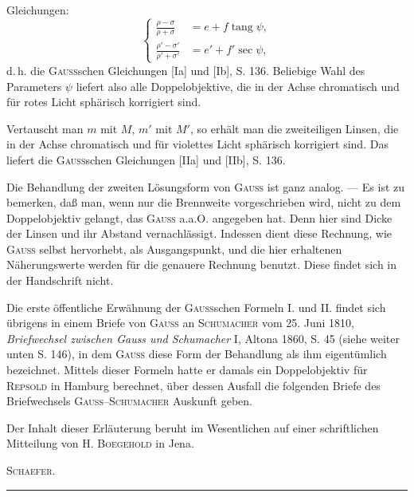 \clearpage{}
\noindent Gleichungen:
\begin{equation*}\tag*{($\rho$)}
\left\{\begin{aligned}
\frac{\rho-\sigma}{\rho+\sigma}&=e+f\operatorname{tang}\psi,\\[4pt]
\frac{\rho'-\sigma'}{\rho'+\sigma'}&=e'+f'\sec\psi,
\end{aligned}\right.
\end{equation*}
\noindent d.\,h. die \textsc{Gauss}schen Gleichungen [Ia] und [Ib], S. 136. Beliebige Wahl des Parameters $\psi$ liefert also alle Doppelobjektive, die in der Achse chromatisch und für rotes Licht sphärisch korrigiert sind.

Vertauscht man $m$ mit $M$, $m'$ mit $M'$, so erhält man die zweiteiligen Linsen, die in der Achse chromatisch und für violettes Licht sphärisch korrigiert sind. Das liefert die \textsc{Gauss}schen Gleichungen [IIa] und [IIb], S. 136.

Die Behandlung der zweiten Lösungsform von \textsc{Gauss} ist ganz analog. — Es ist zu bemerken, daß man, wenn nur die Brennweite vorgeschrieben wird, nicht zu dem Doppelobjektiv gelangt, das \textsc{Gauss} a.a.O. angegeben hat. Denn hier sind Dicke der Linsen und ihr Abstand vernachlässigt. Indessen dient diese Rechnung, wie \textsc{Gauss} selbst hervorhebt, als Ausgangspunkt, und die hier erhaltenen Näherungswerte werden für die genauere Rechnung benutzt. Diese findet sich in der Handschrift nicht.

Die erste öffentliche Erwähnung der \textsc{Gauss}schen Formeln I. und II. findet sich übrigens in einem Briefe von \textsc{Gauss} an \textsc{Schumacher} vom 25. Juni 1810, \textit{Briefwechsel zwischen Gauss und Schumacher} I, Altona 1860, S. 45 (siehe weiter unten S. 146), in dem \textsc{Gauss} diese Form der Behandlung als ihm eigentümlich bezeichnet. Mittels dieser Formeln hatte er damals ein Doppelobjektiv für \textsc{Repsold} in Hamburg berechnet, über dessen Ausfall die folgenden Briefe des Briefwechsels \textsc{Gauss}–\textsc{Schumacher} Auskunft geben.

Der Inhalt dieser Erläuterung beruht im Wesentlichen auf einer schriftlichen Mitteilung von H. \textsc{Boegehold} in Jena.
\begin{flushright}\textsc{Schaefer.}\end{flushright}
\begin{center}\rule{.25\textwidth}{.4pt}\end{center}
\clearpage\endgroup
